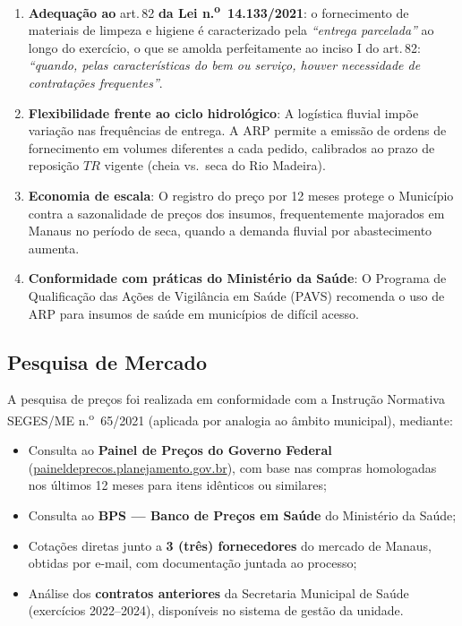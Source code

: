 \documentclass[12pt,a4paper]{article}
\newcommand{\art}[1]{art.\,#1}
\begin{document}
\begin{enumerate}
  \item \textbf{Adequação ao} \art{82} \textbf{da Lei n.\textsuperscript{o}~14.133/2021}:
    o fornecimento de materiais de limpeza e higiene é caracterizado pela \textit{``entrega
    parcelada''} ao longo do exercício, o que se amolda perfeitamente ao inciso I do
    \art{82}: \textit{``quando, pelas características do bem ou serviço, houver necessidade
    de contratações frequentes''}.
  \item \textbf{Flexibilidade frente ao ciclo hidrológico}: A logística fluvial impõe
    variação nas frequências de entrega. A ARP permite a emissão de ordens de fornecimento
    em volumes diferentes a cada pedido, calibrados ao prazo de reposição $TR$ vigente
    (cheia vs.\ seca do Rio Madeira).
  \item \textbf{Economia de escala}: O registro do preço por 12 meses protege o Município
    contra a sazonalidade de preços dos insumos, frequentemente majorados em Manaus no
    período de seca, quando a demanda fluvial por abastecimento aumenta.
  \item \textbf{Conformidade com práticas do Ministério da Saúde}: O Programa de
    Qualificação das Ações de Vigilância em Saúde (PAVS) recomenda o uso de ARP para
    insumos de saúde em municípios de difícil acesso.
\end{enumerate}

\subsection{Pesquisa de Mercado}

A pesquisa de preços foi realizada em conformidade com a Instrução Normativa SEGES/ME
n.\textsuperscript{o}~65/2021 (aplicada por analogia ao âmbito municipal), mediante:

\begin{itemize}
  \item Consulta ao \textbf{Painel de Preços do Governo Federal}
    (\url{paineldeprecos.planejamento.gov.br}), com base nas compras homologadas
    nos últimos 12 meses para itens idênticos ou similares;
  \item Consulta ao \textbf{BPS --- Banco de Preços em Saúde} do Ministério da Saúde;
  \item Cotações diretas junto a \textbf{3 (três) fornecedores} do mercado de Manaus,
    obtidas por e-mail, com documentação juntada ao processo;
  \item Análise dos \textbf{contratos anteriores} da Secretaria Municipal de Saúde
    (exercícios 2022--2024), disponíveis no sistema de gestão da unidade.
\end{itemize}
\end{document}
